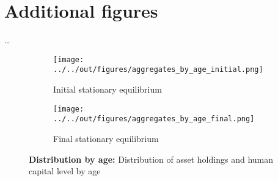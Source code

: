 \section{Additional figures}
\label{sec:figures}

\dots

\begin{figure}[ht]
    \centering
    \begin{subfigure}[b]{0.45\textwidth}
        \centering
        \texttt{[image: ../../out/figures/aggregates\_by\_age\_initial.png]}
        \caption{Initial stationary equilibrium}
        \label{fig:aggregates_by_age_initial}
    \end{subfigure}
    \hfill
    \begin{subfigure}[b]{0.45\textwidth}
        \centering
        \texttt{[image: ../../out/figures/aggregates\_by\_age\_final.png]}
        \caption{Final stationary equilibrium}
        \label{fig:aggregates_by_age_final}
    \end{subfigure}
    \caption{\textbf{Distribution by age:} Distribution of asset holdings and human capital level by age}
    \label{fig:aggregates_by_age}
\end{figure}
